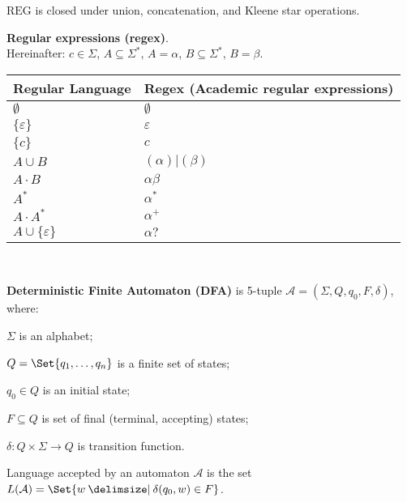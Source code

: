 \documentclass[a4paper,10pt]{article}
\begin{document}
\begin{terms}
    \item $\mathrm{REG}$ is closed under union, concatenation, and Kleene star operations.

    \item \textbf{Regular expressions (regex)}.\\
    Hereinafter: $c \in \Sigma$, $A \subseteq \Sigma^*$, $A = \alpha$,  $B \subseteq \Sigma^*$, $B = \beta$.\\
     \begin{tabular}{ l l }
         \toprule
         Regular Language & Regex (Academic regular expressions) \\ \hline
         $\emptyset$ & $\emptyset$ \\
         $\{\varepsilon\}$ & $\varepsilon$ \\
         $\{c\}$ & $c$ \\
         $A \cup B$ & $(\alpha)|(\beta)$\\
         $A \cdot B$ & $\alpha\beta$\\
         $A^*$ & $\alpha^*$\\
         $A\cdot A^*$ & $\alpha^+$\\
         $A \cup \{\varepsilon\}$ & $\alpha?$\\
     \end{tabular}
    \\
    \item \textbf{Deterministic Finite Automaton (DFA)} is 5-tuple $\mathcal{A} = (\Sigma, Q, q_0, F, \delta)$, where:

    \begin{terms}
        \item $\Sigma$ is an alphabet;
        \item $Q = \Set{q_1, \dots, q_n}$ is a finite set of states;
        \item $q_0 \in Q$ is an initial state;
        \item $F \subseteq Q$ is set of final (terminal, accepting) states;
        \item $\delta \colon Q \times \Sigma \to Q$ is transition function.
    \end{terms}

    \item Language accepted by an automaton $\mathcal{A}$ is the set $L(\mathcal{A}) = \Set{w \given \delta(q_0, w) \in F}$.

\newpage


\end{terms}
\end{document}

